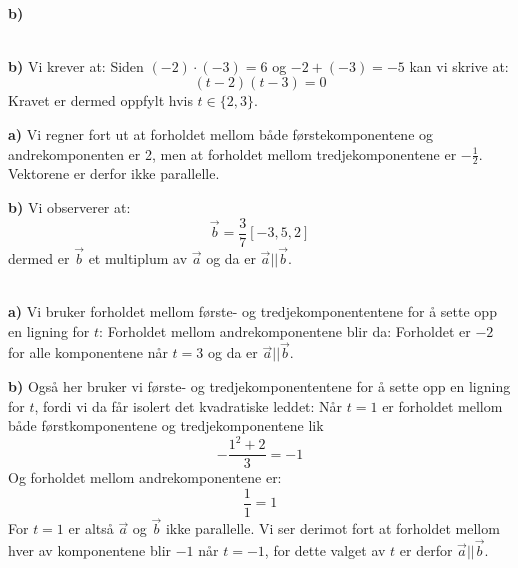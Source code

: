  \\

\textbf{b)} 


\\
\textbf{b)} Vi krever at:
Siden $ (-2)\cdot(-3) = 6 $ og $ -2+(-3)=-5 $ kan vi skrive at:
\[ (t-2)(t-3)=0 \]
Kravet er dermed oppfylt hvis $ t\in\lbrace2, 3\rbrace $. 

\textbf{a)} Vi regner fort ut at forholdet mellom både førstekomponentene og andrekomponenten er 2, men at forholdet mellom tredjekomponentene er $ -\frac{1}{2} $. Vektorene er derfor ikke parallelle.

\textbf{b)} Vi observerer at:
\[ \vec{b}=\frac{3}{7}[-3, 5, 2] \]
dermed er $ \vec{b} $ et multiplum av $ \vec{a} $ og da er $ \vec{a}||\vec{b} $.

\\
\textbf{a)} Vi bruker forholdet mellom første- og tredjekomponententene for å sette opp en ligning for $ t $:
Forholdet mellom andrekomponentene blir da:
Forholdet er $ -2 $ for alle komponentene når $ t=3 $ og da er $ \vec{a}||\vec{b} $.

\textbf{b)} Også her bruker vi første- og tredjekomponententene for å sette opp en ligning for $ t $, fordi vi da får isolert det kvadratiske leddet:
Når $ t=1 $ er forholdet mellom både førstkomponentene og tredjekomponentene lik
\[ -\frac{1^2+2}{3}=-1 \]
Og forholdet mellom andrekomponentene er:
\[ \frac{1}{1}=1 \]
For $ t=1 $ er altså $ \vec{a} $ og $ \vec{b} $ ikke parallelle. Vi ser derimot fort at forholdet mellom hver av komponentene blir $ -1 $ når $ t=-1 $, for dette valget av $ t $ er derfor $ \vec{a}||\vec{b} $.

